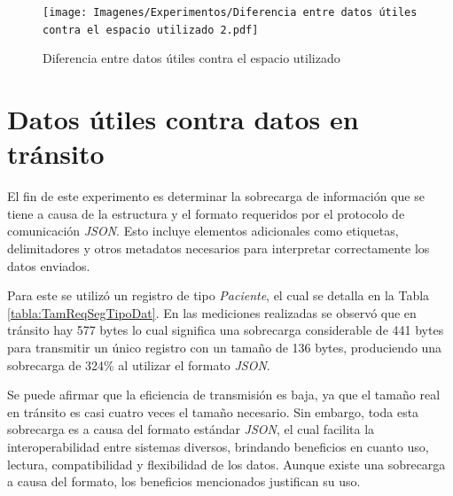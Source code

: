 
\begin{figure}
    \centering
    \texttt{[image: Imagenes/Experimentos/Diferencia entre datos útiles contra el espacio utilizado 2.pdf]}
    \caption{Diferencia entre datos útiles contra el espacio utilizado}
    \label{fig:DatosUtilesVsEspacio2}
\end{figure}



\section{Datos útiles contra datos en tránsito}
\label{sec:datosUtilesVsDatosEnTransito}
El fin de este experimento es determinar la sobrecarga de información que se tiene a causa de la estructura y el formato requeridos por el protocolo de comunicación \textit{JSON}. Esto incluye elementos adicionales como etiquetas, delimitadores y otros metadatos necesarios para interpretar correctamente los datos enviados. 

Para este se utilizó un registro de tipo \textit{Paciente}, el cual se detalla en la Tabla \ref{tabla:TamReqSegTipoDat}. En las mediciones realizadas se observó que en tránsito hay 577 bytes lo cual significa una sobrecarga considerable de 441 bytes para transmitir un único registro con un tamaño de 136 bytes, produciendo una sobrecarga de 324\% al utilizar el formato \textit{JSON}.

Se puede afirmar que la eficiencia de transmisión es baja, ya que el tamaño real en tránsito es casi cuatro veces el tamaño necesario. Sin embargo, toda esta sobrecarga es a causa del formato estándar \textit{JSON}, el cual facilita la interoperabilidad entre sistemas diversos, brindando beneficios en cuanto uso, lectura, compatibilidad y flexibilidad de los datos. Aunque existe una sobrecarga a causa del formato, los beneficios mencionados justifican su uso.


